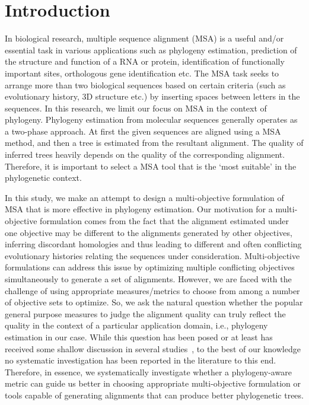 \section{Introduction}
\label{sec:introducntion}
In biological research, multiple sequence alignment (MSA) is a useful and/or essential task in various applications such as phylogeny estimation, prediction of the structure and function of a RNA or protein, identification of functionally important sites, orthologous gene identification etc. The MSA task seeks to arrange more than two biological sequences based on certain criteria (such as evolutionary history, 3D structure etc.) by inserting spaces between letters in the sequences.  In this research, we limit our focus on MSA in the context of phylogeny. Phylogeny estimation from molecular sequences generally operates as a two-phase approach. At first the given sequences are aligned using a MSA method, and then a tree is estimated from the resultant alignment. The quality of inferred trees heavily depends on the quality of the corresponding alignment. Therefore, it is important to select a MSA tool that is the `most suitable' in the phylogenetic context.

In this study, we make an attempt to design a multi-objective formulation of MSA that is more effective in phylogeny estimation. Our motivation for a multi-objective formulation comes from the fact that the alignment estimated under one objective may be different to the alignments generated by other objectives, inferring discordant homologies and thus leading to different and often conflicting evolutionary histories relating the sequences under consideration. Multi-objective formulations can address this issue by optimizing multiple conflicting objectives simultaneously to generate a set of alignments. However, we are faced with the challenge of using appropriate measures/metrics to choose from among a number of objective sets to optimize. So, we ask the natural question whether the popular general purpose measures to judge the alignment quality can truly reflect the quality in the context of a particular application domain, i.e., phylogeny estimation in our case. While this question has been posed or at least has received some shallow discussion in several studies~\citep{warnow2013large, mirarab2015pasta, liu2009rapid}, to the best of our knowledge no systematic investigation has been reported in the literature to this end. Therefore, in essence, we systematically investigate whether a phylogeny-aware metric can guide us better in choosing appropriate multi-objective formulation or tools capable of generating alignments that can produce better phylogenetic trees.

